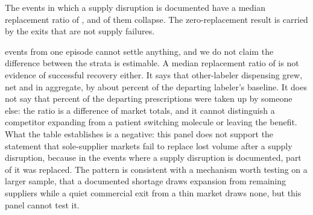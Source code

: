 \documentclass[pdflatex,sn-vancouver-num,Numbered]{sn-jnl}
\begin{document}
The \nCauseSupplyW events in which a supply disruption is documented have a median replacement
ratio of \nSupplyMedian, and \nCauseSupplyColl of them collapse. The zero-replacement result is
carried by the exits that are not supply failures.

\begin{table}[htbp]
\caption{Replacement among near-sole-labeler exits, by what the exit is verified to be. The
documented-disruption row covers \nCauseSupplyW events arising from one episode, since the two
varenicline exits are one recall.}\label{tab:strata}

\end{table}

\begin{table}[htbp]
\small
\caption{The exclusion ladder. Each row is a population defined by which
alternative-explanation classes are removed, with the replacement median and the collapse count
computed on that population alone. These are six descriptions of six samples and not six
estimates of one quantity: the rows differ in which events they contain, not in how an estimand
is computed, and the differences between them are the sensitivity of the pooled figures to the
audit rather than a causal measure of anything. The fourth row removes only the explanations
whose record is market-wide or names the firm and the formulation.}\label{tab:ladder}

\end{table}

\nCauseSupplyUC events from one episode cannot settle anything, and we do not claim the
difference between the strata is estimable. A median replacement ratio of \nSupplyMedian is not
evidence of successful recovery either. It says that other-labeler dispensing grew, net and in
aggregate, by about \nSupplyMedianPct percent of the departing labeler's baseline. It does not say
that \nSupplyMedianPct percent of the departing prescriptions were taken up by someone else: the
ratio is a difference of market totals, and it cannot distinguish a competitor expanding from a
patient switching molecule or leaving the benefit.
What the table establishes is a negative: this panel does not support the statement that
sole-supplier markets fail to replace lost volume after a supply disruption, because in the
events where a supply disruption is documented, part of it was replaced. The pattern is
consistent with a mechanism worth testing on a larger sample, that a documented shortage draws
expansion from remaining suppliers while a quiet commercial exit from a thin market draws none,
but this panel cannot test it.
\end{document}
